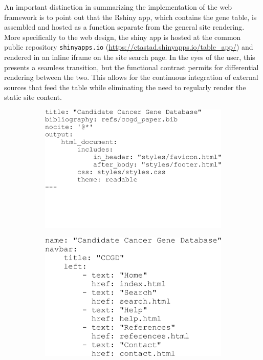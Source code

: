 \documentclass[10pt]{report}
\begin{document}
An important distinction in summarizing the implementation of the web framework is to point out that the Rshiny app, which contains the gene table, is assembled and hosted as a function separate from the general site rendering. More specifically to the web design, the shiny app is hosted at the common public repository \texttt{shinyapps.io} (\url{https://ctastad.shinyapps.io/table_app/}) and rendered in an inline iframe on the site search page. In the eyes of the user, this presents a seamless transition, but the functional contrast permits for differential rendering between the two. This allows for the continuous integration of external sources that feed the table while eliminating the need to regularly render the static site content.

\begin{figure}
    \center{}
    \begin{subfigure}[t]{.3\textwidth}
        \center{}
        \includegraphics[width=\textwidth]{fig/page_header.pdf}
        \label{fig:pageHeader}
    \end{subfigure}%
    \hspace{2em}
    \begin{subfigure}[t]{.3\textwidth}
        \center{}
        \includegraphics[width=\textwidth]{fig/site_header.pdf}

\end{subfigure}
\end{figure}
\end{document}
